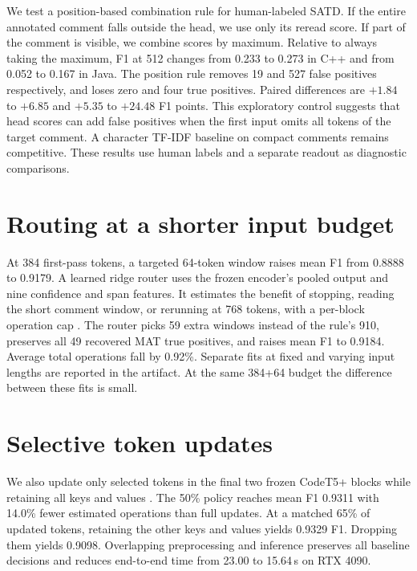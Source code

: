 \documentclass[10pt,conference]{IEEEtran}
\begin{document}

We test a position-based combination rule for human-labeled SATD. If the entire annotated comment falls outside the head, we use only its reread score. If part of the comment is visible, we combine scores by maximum. Relative to always taking the maximum, F1 at 512 changes from 0.233 to 0.273 in C++ and from 0.052 to 0.167 in Java. The position rule removes 19 and 527 false positives respectively, and loses zero and four true positives. Paired differences are $+1.84$ to $+6.85$ and $+5.35$ to $+24.48$ F1 points. This exploratory control suggests that head scores can add false positives when the first input omits all tokens of the target comment. A character TF-IDF baseline on compact comments remains competitive. These results use human labels and a separate readout as diagnostic comparisons.

\section{Routing at a shorter input budget}
At 384 first-pass tokens, a targeted 64-token window raises mean F1 from 0.8888 to 0.9179. A learned ridge router uses the frozen encoder's pooled output and nine confidence and span features. It estimates the benefit of stopping, reading the short comment window, or rerunning at 768 tokens, with a per-block operation cap \cite{cascade}. The router picks 59 extra windows instead of the rule's 910, preserves all 49 recovered MAT true positives, and raises mean F1 to 0.9184. Average total operations fall by 0.92\%. Separate fits at fixed and varying input lengths are reported in the artifact. At the same 384+64 budget the difference between these fits is small.

\section{Selective token updates}
We also update only selected tokens in the final two frozen CodeT5+ blocks
while retaining all keys and values \cite{powerbert,mod}. The 50\% policy
reaches mean F1 0.9311 with 14.0\% fewer estimated operations than full
updates. At a matched 65\% of updated tokens, retaining the other keys
and values yields 0.9329 F1. Dropping them yields 0.9098. Overlapping
preprocessing and inference preserves all baseline decisions and reduces
end-to-end time from 23.00 to 15.64\,s on RTX 4090.


\end{document}
